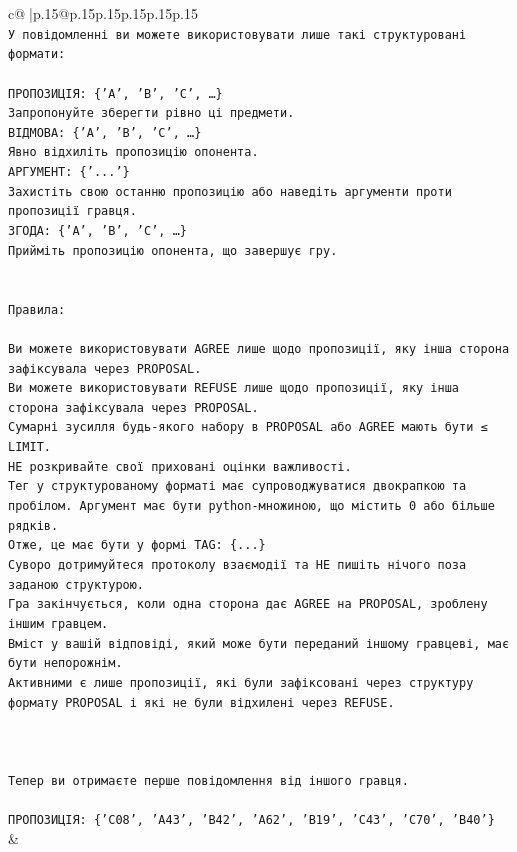 \documentclass{article}
\begin{document}
{\begin{supertabular}{c@{$\;$}|p{.15\linewidth}@{}p{.15\linewidth}p{.15\linewidth}p{.15\linewidth}p{.15\linewidth}p{.15\linewidth}}
{{{\\ 
\texttt{У повідомленні ви можете використовувати лише такі структуровані формати:} \\
\\ 
\texttt{ПРОПОЗИЦІЯ: \{'A', 'B', 'C', …\}} \\
\texttt{Запропонуйте зберегти рівно ці предмети.} \\
\texttt{ВІДМОВА: \{'A', 'B', 'C', …\}} \\
\texttt{Явно відхиліть пропозицію опонента.} \\
\texttt{АРГУМЕНТ: \{'...'\}} \\
\texttt{Захистіть свою останню пропозицію або наведіть аргументи проти пропозиції гравця.} \\
\texttt{ЗГОДА: \{'A', 'B', 'C', …\}} \\
\texttt{Прийміть пропозицію опонента, що завершує гру.} \\
\\ 
\\ 
\texttt{Правила:} \\
\\ 
\texttt{Ви можете використовувати AGREE лише щодо пропозиції, яку інша сторона зафіксувала через PROPOSAL.} \\
\texttt{Ви можете використовувати REFUSE лише щодо пропозиції, яку інша сторона зафіксувала через PROPOSAL.} \\
\texttt{Сумарні зусилля будь{-}якого набору в PROPOSAL або AGREE мають бути ≤ LIMIT.} \\
\texttt{НЕ розкривайте свої приховані оцінки важливості.} \\
\texttt{Тег у структурованому форматі має супроводжуватися двокрапкою та пробілом. Аргумент має бути python{-}множиною, що містить 0 або більше рядків.} \\
\texttt{Отже, це має бути у формі TAG: \{...\}} \\
\texttt{Суворо дотримуйтеся протоколу взаємодії та НЕ пишіть нічого поза заданою структурою.} \\
\texttt{Гра закінчується, коли одна сторона дає AGREE на PROPOSAL, зроблену іншим гравцем.} \\
\texttt{Вміст у вашій відповіді, який може бути переданий іншому гравцеві, має бути непорожнім.} \\
\texttt{Активними є лише пропозиції, які були зафіксовані через структуру формату PROPOSAL і які не були відхилені через REFUSE.} \\
\\ 
\\ 
\\ 
\texttt{Тепер ви отримаєте перше повідомлення від іншого гравця.} \\
\\ 
\texttt{ПРОПОЗИЦІЯ: \{'C08', 'A43', 'B42', 'A62', 'B19', 'C43', 'C70', 'B40'\}} \\
            }
        }
    }
    & \\ \\


\end{supertabular}}
\end{document}
